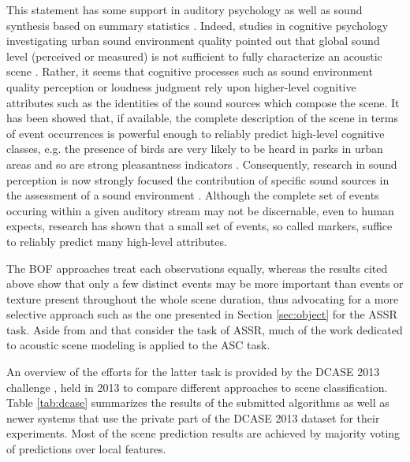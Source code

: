 \documentclass[journal]{IEEEtran}
\makeatletter
\newcommand*{\eg}{e.g.\@\xspace}
\makeatother
\begin{document}
This statement has some support in auditory psychology as well as sound synthesis based on summary statistics \cite{mcdermott2013summary}. Indeed, studies in cognitive psychology investigating urban sound environment quality pointed out that global sound level (perceived or measured) is not sufficient to fully characterize an acoustic scene \cite{guyot2005urban,kang2006urban}. Rather, it seems that cognitive processes such as sound environment quality perception \cite{dubois2006cognitive} or loudness judgment \cite{kuwano_memory_2003} rely upon higher-level cognitive attributes such as the identities of the sound sources which compose the scene. It has been showed that, if available, the complete description of the scene in terms of event occurrences is powerful enough to reliably predict high-level cognitive classes, \eg the presence of birds are very likely to be heard in parks in urban areas and so are strong pleasantness indicators \cite{lafayPartI}. Consequently, research in sound perception is now strongly focused the contribution of specific sound sources in the assessment of a sound environment \cite{ricciardi2015sound,lavandier2006contribution}. Although the complete set of events occuring within a given auditory stream may not be discernable, even to human expects, research has shown that a small set of events, so called markers, suffice to reliably predict many high-level attributes.

The BOF approaches treat each observations equally, whereas the results cited above show that only a few distinct events may be more important than events or texture present throughout the whole scene duration, thus advocating for a more selective approach such as the one presented in Section \ref{sec:object} for the ASSR task. Aside from \cite{aucouturier2007bag} and \cite{lagrange:hal-01082501} that consider the task of ASSR, much of the work dedicated to acoustic scene modeling is applied to the ASC task.

An overview of the efforts for the latter task is provided by the DCASE 2013 challenge \cite{barchiesi2015acoustic}, held in 2013 to compare different approaches to scene classification. Table \ref{tab:dcase} summarizes the results of the submitted algorithms as well as newer systems that use the private part of the DCASE 2013 dataset for their experiments. Most of the scene prediction results are achieved by majority voting of predictions over local features.
\end{document}
